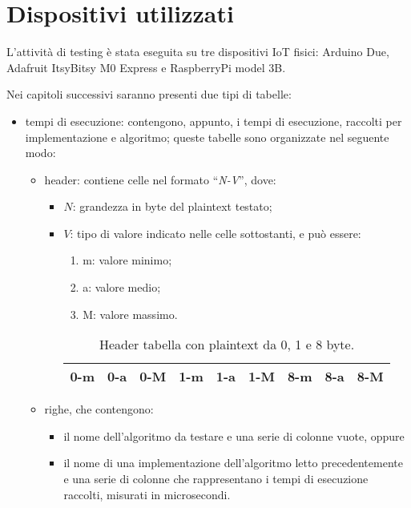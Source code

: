 \newpage

\section{Dispositivi utilizzati}

L'attività di testing è stata eseguita su tre dispositivi IoT fisici: Arduino Due, Adafruit ItsyBitsy M0 Express e RaspberryPi model 3B.

\noindent Nei capitoli successivi saranno presenti due tipi di tabelle:
\begin{itemize}
    \item tempi di esecuzione: contengono, appunto, i tempi di esecuzione, raccolti per implementazione e algoritmo; queste tabelle sono organizzate nel seguente modo:
    \begin{itemize}
        \item header: contiene celle nel formato ``\textit{N-V}'', dove:
        \begin{itemize}
            \item $N$: grandezza in byte del plaintext testato;
            \item $V$: tipo di valore indicato nelle celle sottostanti, e può essere:
            \begin{enumerate}[label=(\arabic*)]
                \item m: valore minimo;
                \item a: valore medio;
                \item M: valore massimo.
            \end{enumerate}
            \begin{table}[H]
                \centering
            	\begin{tabular}{|c|c|c|c|c|c|c|c|c|}
            		\hline
            		0-m & 0-a & 0-M & 1-m & 1-a & 1-M & 8-m & 8-a & 8-M \\
            		\hline
                \end{tabular}
                \caption{Header tabella con plaintext da 0, 1 e 8 byte.}
            \end{table}
        \end{itemize}
        \item righe, che contengono:
            \begin{itemize}
                \item il nome dell'algoritmo da testare e una serie di colonne vuote, oppure
                \item il nome di una implementazione dell'algoritmo letto precedentemente e una serie di colonne che rappresentano i tempi di esecuzione raccolti, misurati in microsecondi.

\end{itemize}
\end{itemize}
\end{itemize}
